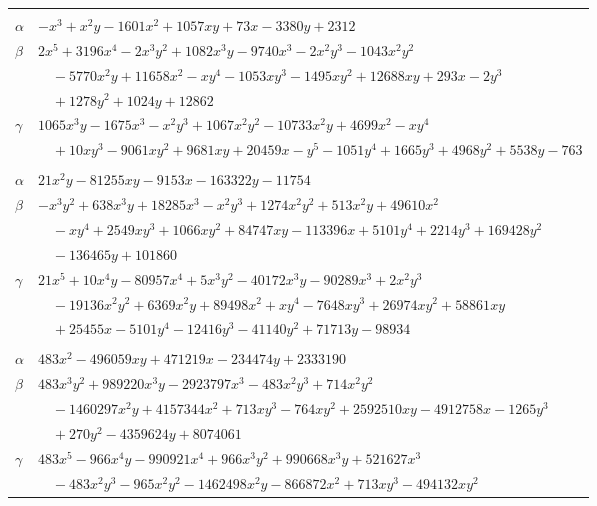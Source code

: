 \documentclass[11pt]{article}
\begin{document}
\begin{longtable}{@{}ll@{}}
\addlinespace[3pt]
\multicolumn{2}{@{}l}{$\{i,j\}=\{40,61\}$, $k_{ij}=2^{3}\cdot 3^{3}\cdot 5^{2}\cdot 7$}\\
$\alpha$ & $-x^{3}+x^{2}y-1601x^{2}+1057xy+73x-3380y+2312$\\
$\beta$ & $2x^{5}+3196x^{4}-2x^{3}y^{2}+1082x^{3}y-9740x^{3}-2x^{2}y^{3}-1043x^{2}y^{2}$\\
 & $\quad -5770x^{2}y+11658x^{2}-xy^{4}-1053xy^{3}-1495xy^{2}+12688xy+293x-2y^{3}$\\
 & $\quad +1278y^{2}+1024y+12862$\\
$\gamma$ & $1065x^{3}y-1675x^{3}-x^{2}y^{3}+1067x^{2}y^{2}-10733x^{2}y+4699x^{2}-xy^{4}$\\
 & $\quad +10xy^{3}-9061xy^{2}+9681xy+20459x-y^{5}-1051y^{4}+1665y^{3}+4968y^{2}+5538y-763$\\
\addlinespace[3pt]
\multicolumn{2}{@{}l}{$\{i,j\}=\{40,76\}$, $k_{ij}=2^{5}\cdot 3\cdot 5^{2}\cdot 7\cdot 13$}\\
$\alpha$ & $21x^{2}y-81255xy-9153x-163322y-11754$\\
$\beta$ & $-x^{3}y^{2}+638x^{3}y+18285x^{3}-x^{2}y^{3}+1274x^{2}y^{2}+513x^{2}y+49610x^{2}$\\
 & $\quad -xy^{4}+2549xy^{3}+1066xy^{2}+84747xy-113396x+5101y^{4}+2214y^{3}+169428y^{2}$\\
 & $\quad -136465y+101860$\\
$\gamma$ & $21x^{5}+10x^{4}y-80957x^{4}+5x^{3}y^{2}-40172x^{3}y-90289x^{3}+2x^{2}y^{3}$\\
 & $\quad -19136x^{2}y^{2}+6369x^{2}y+89498x^{2}+xy^{4}-7648xy^{3}+26974xy^{2}+58861xy$\\
 & $\quad +25455x-5101y^{4}-12416y^{3}-41140y^{2}+71713y-98934$\\
\addlinespace[3pt]
\multicolumn{2}{@{}l}{$\{i,j\}=\{40,82\}$, $k_{ij}=2^{6}\cdot 3^{5}\cdot 5^{2}\cdot 7^{2}$}\\
$\alpha$ & $483x^{2}-496059xy+471219x-234474y+2333190$\\
$\beta$ & $483x^{3}y^{2}+989220x^{3}y-2923797x^{3}-483x^{2}y^{3}+714x^{2}y^{2}$\\
 & $\quad -1460297x^{2}y+4157344x^{2}+713xy^{3}-764xy^{2}+2592510xy-4912758x-1265y^{3}$\\
 & $\quad +270y^{2}-4359624y+8074061$\\
$\gamma$ & $483x^{5}-966x^{4}y-990921x^{4}+966x^{3}y^{2}+990668x^{3}y+521627x^{3}$\\
 & $\quad -483x^{2}y^{3}-965x^{2}y^{2}-1462498x^{2}y-866872x^{2}+713xy^{3}-494132xy^{2}$\\

\end{longtable}
\end{document}
